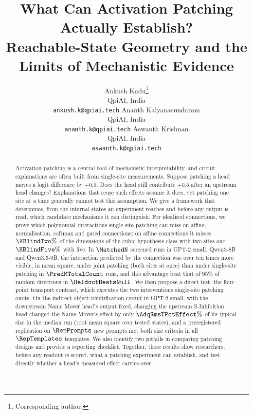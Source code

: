 \documentclass{article}
\title{What Can Activation Patching Actually Establish?\\
       Reachable-State Geometry and the Limits of Mechanistic Evidence}
\author{Ankush Kadu\thanks{Corresponding author.}\\
  QpiAI, India\\
  \texttt{ankush.k@qpiai.tech} \And
  Ananth Kalyanasundaram\\
  QpiAI, India\\
  \texttt{ananth.k@qpiai.tech} \And
  Aswanth Krishnan\\
  QpiAI, India\\
  \texttt{aswanth.k@qpiai.tech}}
\theoremstyle{plain}
\theoremstyle{definition}
\begin{document}
\maketitle



\begin{abstract}
Activation patching is a central tool of mechanistic interpretability, and circuit explanations are often built from
single-site measurements. Suppose patching a head moves a logit difference by $+0.5$. Does the head still contribute
$+0.5$ after an upstream head changes? Explanations that reuse such effects assume it does, yet patching one site at a
time generally cannot test this assumption. We give a framework that determines, from the internal states an
experiment reaches and before any output is read, which candidate mechanisms it can distinguish. For idealised
connections, we prove which polynomial interactions single-site patching can miss on affine, normalisation, softmax and
gated connections; on affine connections it misses $\KBlindTwo\%$ of the dimensions of the cubic hypothesis class with
two sites and $\KBlindFive\%$ with five. In $\MatchedN$ screened runs in GPT-2 small, Qwen3-8B and Qwen3.5-9B, the interaction predicted by the connection
was over ten times more visible, in mean square, under joint patching (both sites at once) than under single-site
patching in $\PredMTotalCount$ runs, and this advantage beat that of $95\%$ of random directions in
$\HeldoutBeatsNull$. We then propose a direct test, the four-point transport contrast, which executes the two
interventions single-site patching omits. On the indirect-object-identification circuit in GPT-2 small, with the
downstream Name Mover head's output fixed, changing the upstream S-Inhibition head changed the Name Mover's effect by
only $\AdqRmsTPctEffect\%$ of its typical size in the median run (root mean square over tested states), and a
preregistered replication on $\RepPrompts$ new prompts met both size criteria in all $\RepTemplates$ templates. We also identify two pitfalls in comparing patching designs and provide a reporting checklist. Together, these
results show researchers, before any readout is scored, what a patching experiment can establish, and test directly whether a head's measured effect carries over.
\end{abstract}

\begingroup\let\thefootnote\relax{}\endgroup
\end{document}
